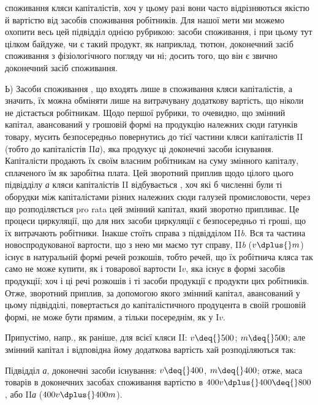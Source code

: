 \parcont{}  %
споживання кляси капіталістів, хоч у цьому разі вони часто відрізняються
якістю й вартістю від засобів споживання робітників. Для нашої мети
ми можемо охопити весь цей підвідділ однією рубрикою: 
засоби споживання, і при цьому тут цілком байдуже, чи є такий продукт,
як наприклад, тютюн, доконечний засіб споживання з фізіологічного
погляду чи ні; досить того, що він є звично доконечний засіб споживання.

Ь) Засоби споживання \deq{} , що входять лише в
споживання кляси капіталістів, а значить, їх можна обміняти лише на
витрачувану додаткову вартість, що ніколи не дістається робітникам.
Щодо першої рубрики, то очевидно, що змінний капітал, авансований у
грошовій формі на продукцію належних сюди ґатунків товару, мусить
безпосередньо повернутись до тієї частини кляси капіталістів II (тобто
до капіталістів II\emph{а}), яка продукує ці доконечні засоби існування.
Капіталісти продають їх своїм власним робітникам на суму змінного капіталу,
сплаченого їм як заробітна плата. Цей зворотний приплив щодо цілого
цього підвідділу \emph{а} кляси капіталістів II відбувається ,
хоч які б численні були ті оборудки між капіталістами різних належних
сюди галузей промисловости, через що розподіляється pro rata
цей змінний капітал, який зворотно припливає. Це процеси циркуляції,
що для них засоби циркуляції є безпосередньо ті гроші, що їх витрачають
робітники. Інакше стоїть справа з підвідділом II\emph{b}. Вся та частина
новоспродукованої вартости, що з нею ми маємо тут справу, II\emph{b} ($v \dplus{} m$)
існує в натуральній формі речей розкошів, тобто речей, що їх робітнича
кляса так само не може купити, як і товарової вартости I$v$, яка існує
в формі засобів продукції; хоч і ці речі розкошів і ті засоби продукції
є продукти цих робітників. Отже, зворотний приплив, за допомогою
якого змінний капітал, авансований у цьому підвідділі, повертається до
капіталістичного продуцента в своїй грошовій формі, не може бути
прямим, а тільки посереднім, як у I$v$.

Припустімо, напр., як раніше, для всієї кляси II: $v \deq{} 500$; $m \deq{} 500$;
але змінний капітал і відповідна йому додаткова вартість хай розподіляються
так:

Підвідділ \emph{а}, доконечні засоби існування: $v \deq{} 400$, $m \deq{} 400$; отже,
маса товарів в доконечних засобах споживання вартістю в $400 v \dplus{} 400 \deq{} 800$,
або II\emph{а} ($400 v \dplus{} 400 m$).

